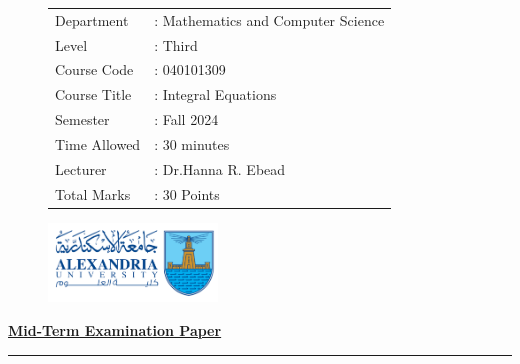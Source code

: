 \documentclass[]{article}
\begin{document}
\thispagestyle{empty}
\begin{figure}
    \begin{minipage}{0.7\textwidth}
        \begin{tabular}{l l}
            Department   & : Mathematics and Computer Science \\
            Level        & : Third                            \\
            Course Code  & : 040101309                        \\
            Course Title & :  Integral Equations              \\
            Semester     & : Fall 2024                        \\
            Time Allowed & : 30 minutes                       \\
            Lecturer     & : Dr.Hanna R. Ebead                \\
            Total Marks  & : 30 Points                        \\
        \end{tabular}
    \end{minipage}%
    \begin{minipage}{0.3\textwidth}
        \includegraphics[width=4.5cm]{collagelogo.png}
    \end{minipage}
\end{figure}
\vspace*{-1cm}
\begin{center}
    \textbf{\underline{\LARGE Mid-Term Examination Paper}}
\end{center}
\vspace*{.2cm}

\hrule
\end{document}
